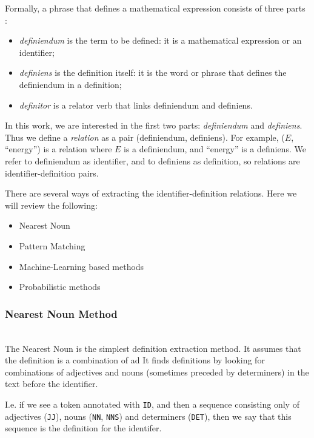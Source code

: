 Formally, a phrase that defines a mathematical expression consists of three parts \cite{kristianto2012extracting}:

\begin{itemize}
\itemsep1pt\parskip0pt
  \item \emph{definiendum} is the term to be defined: it is a mathematical expression
      or an identifier;
  \item \emph{definiens} is the definition itself: it is the word or phrase that defines the definiendum in a definition;
  \item \emph{definitor} is a relator verb that links definiendum and definiens.
\end{itemize}

In this work, we are interested in the first two parts: \emph{definiendum} and
\emph{definiens}. Thus we define a \emph{relation} as a pair
(definiendum, definiens). For example, ($E$, ``energy'') is a relation where
$E$ is a definiendum, and ``energy'' is a definiens. We refer to definiendum as
identifier, and to definiens as definition, so relations are identifier-definition
pairs.

There are several ways of extracting the identifier-definition relations.
Here we will review the following:

\begin{itemize}
\itemsep1pt\parskip0pt
  \item Nearest Noun
  \item Pattern Matching
  \item Machine-Learning based methods
  \item Probabilistic methods
\end{itemize}


\subsubsection{Nearest Noun Method} \ \\

The Nearest Noun  \cite{grigore2009towards} \cite{yokoi2011contextual}
is the simplest definition extraction method.
It assumes that the definition is a combination of ad
It finds definitions by looking for combinations of adjectives and nouns
(sometimes preceded by determiners) in the text before the identifier.

I.e. if we see a token annotated with \texttt{ID}, and then a sequence
consisting only of adjectives (\texttt{JJ}), nouns (\texttt{NN}, \texttt{NNS})
and determiners (\texttt{DET}), then we say that this sequence is
the definition for the identifer.


